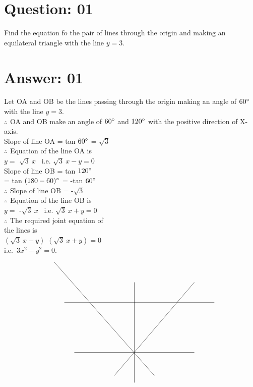 \documentclass[17pt]{extarticle}
\begin{document}
\noindent
\begin{fleqn} 


\section{Question: 01}
Find the equation fo the pair of lines through the origin and making an equilateral triangle with the line $y = 3.$


\section{Answer: 01}
Let OA and OB be the lines passing through the origin making an angle of $ 60\degree$ with the line $y = 3.$ \\
$\therefore$ OA and OB make an angle of $60\degree$ and $ 120\degree$ with the positive direction of X-axis.\\ 
Slope of line OA = tan $60\degree$ = $\sqrt{3}$ \\
$\therefore$ Equation of the line OA is\\  
$y=$ $\sqrt{3}\ x$ \ i.e. $\sqrt{3}\ x - y = 0 $ \\ 
Slope of line OB = tan $120\degree$ \\
= tan $(180 - 60)\degree$ = -tan $60\degree$\\
$\therefore$ Slope of line OB = -$\sqrt{3}$ \\
$\therefore$ Equation of the line OB is\\  
$y=$ -$\sqrt{3}\ x$ \ i.e. $\sqrt{3}\ x + y = 0 $ \\
$\therefore$ The required joint equation of\\ the lines is\\
$\left( \sqrt{3}\ x - y\right)$ $\left( \sqrt{3}\ x + y\right) = 0 $\\
i.e.\ $ 3x^2 - y^2 = 0.$

\begin{equation} \nonumber
\quad
\begin{alignedat}{4}
\begin{tikzpicture}

\draw (1,0.5) -- (7,0.5); 
\draw (4,-1) -- (4,4);
\draw (0.5,3) -- (8,3); 
\draw (3,-0.65) -- (7,4); 
\draw (5,-0.65) -- (0,5);

\end{tikzpicture}
\end{alignedat}
\end{equation}
\quad
\begin{equation} \nonumber
\end{equation}


\end{fleqn}
\end{document}
